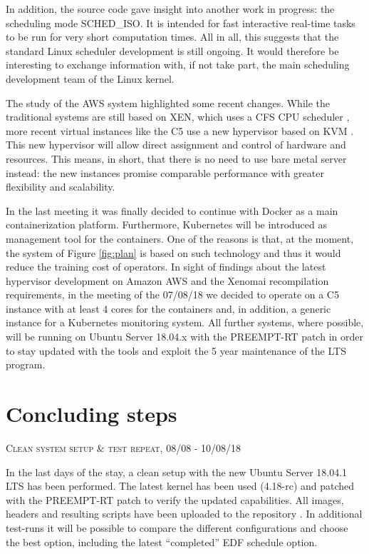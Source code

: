 \documentclass[]{scrartcl}
\begin{document}
In addition, the source code gave insight into another work in progress: the scheduling mode SCHED\_ISO. It is intended for fast interactive real-time tasks to be run for very short computation times. All in all, this suggests that the standard Linux scheduler  development is still ongoing.
It would therefore be interesting to exchange information with, if not take part, the main scheduling development team of the Linux kernel.

The study of the AWS system highlighted some recent changes. While the traditional systems are still based on XEN, which uses a CFS CPU scheduler \cite{xen01}, more recent virtual instances like the C5 use a new hypervisor based on KVM \cite{amazon01}.
This new hypervisor will allow direct assignment and control of hardware and resources.
This means, in short, that there is no need to use bare metal server instead: the new instances promise comparable performance with greater flexibility and scalability.

In the last meeting it was finally decided to continue with Docker as a main containerization platform. Furthermore, Kubernetes will be introduced as management tool for the containers.
One of the reasons is that, at the moment, the system of Figure \ref{fig:plan} is based on such technology and thus it would reduce the training cost of operators.
In sight of findings about the latest hypervisor development on Amazon AWS and the Xenomai recompilation requirements, in the meeting of the 07/08/18 we decided to operate on a C5 instance with at least 4 cores for the containers and, in addition, a generic instance for a Kubernetes monitoring system.
All further systems, where possible, will be running on Ubuntu Server 18.04.x with the PREEMPT-RT patch in order to stay updated with the tools and exploit the 5 year maintenance of the LTS program.

\section{Concluding steps}

{\small\textsc{Clean system setup \& test repeat, 08/08 - 10/08/18} \bigskip}

In the last days of the stay, a clean setup with the new Ubuntu Server 18.04.1 LTS has been performed. The latest kernel has been used (4.18-rc) and patched with the PREEMPT-RT patch to verify the updated capabilities. 
All images, headers and resulting scripts have been uploaded to the repository \cite{gitrepo}. In additional test-runs it will be possible to compare the different configurations and choose the best option, including the latest ``completed'' EDF schedule option.
\end{document}
